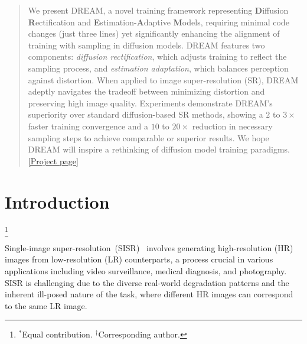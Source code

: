 \documentclass[10pt,twocolumn,letterpaper]{article}
\newcommand\blfootnote[1]{%
  \begingroup
  \renewcommand\thefootnote{}\footnote{#1}%
  \addtocounter{footnote}{-1}%
  \endgroup
}
\begin{document}
\begin{abstract}
We present DREAM, a novel training framework representing \textbf{D}iffusion \textbf{R}ectification and \textbf{E}stimation-\textbf{A}daptive \textbf{M}odels,  requiring minimal code changes (just three lines) yet significantly enhancing the alignment of training with sampling in diffusion models. DREAM features two components: \emph{diffusion rectification}, which adjusts training to reflect the sampling process,  and \emph{estimation adaptation}, which balances perception against distortion. When applied to image super-resolution (SR), DREAM adeptly navigates the tradeoff between minimizing distortion and preserving high image quality.  Experiments demonstrate DREAM's superiority over standard diffusion-based SR methods, showing a $2$ to $3\times $ faster training convergence and a $10$ to $20\times$ reduction in necessary sampling steps  to achieve comparable or superior results. We hope DREAM will inspire a rethinking of diffusion model training paradigms. \href{https://www.tianyuding.com/projects/DREAM/}{[Project page]}
\end{abstract}


\section{Introduction}
\label{sec:intro}

\blfootnote{$^*$Equal contribution. $^\dagger$Corresponding author.}Single-image super-resolution~(SISR)~\cite{sun2010gradient,dong2014learning, bevilacqua2012low, yan2015single} involves generating high-resolution (HR) images from low-resolution (LR) counterparts, a process crucial in various applications including  video surveillance, medical diagnosis, and  photography. SISR is challenging due to the diverse real-world degradation patterns and the inherent ill-posed nature of the task, where different HR images can correspond to the same LR image.
\end{document}
